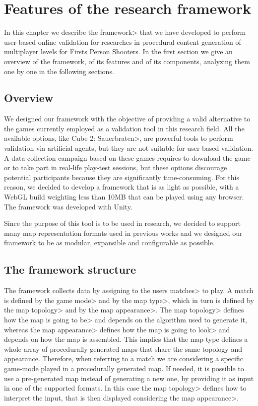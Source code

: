 \chapter{Features of the research framework}


In this chapter we describe the \<framework> that we have developed to perform user-based online validation for researches in procedural content generation of multiplayer levels for Firsts Person Shooters. In the first section we give an overview of the framework, of its features and of its components, analyzing them one by one in the following sections.


\section{Overview}

We designed our framework with the objective of providing a valid alternative to the games currently employed as a validation tool in this research field. All the available options, like \<Cube 2: Sauerbraten>, are powerful tools to perform validation via artificial agents, but they are not suitable for user-based validation. A data-collection campaign based on these games requires to download the game or to take part in real-life play-test sessions, but these options discourage potential participants because they are significantly time-consuming. For this reason, we decided to develop a framework that is as light as possible, with a WebGL build weighting less than 10MB that can be played using any browser. The framework was developed with Unity.

\par

Since the purpose of this tool is to be used in research, we decided to support many map representation formats used in previous works and we designed our framework to be as modular, expansible and configurable as possible.

\section{The framework structure}

The framework collects data by assigning to the users \<matches> to play. A match is defined by the \<game mode> and by the \<map type>, which in turn is defined by the \<map topology> and by the \<map appearance>. The \<map topology> defines how the map is going to \<be> and depends on the algorithm used to generate it, whereas the \<map appearance> defines how the map is going to \<look> and depends on how the map is assembled. This implies that the map type defines a whole array of procedurally generated maps that share the same topology and appearance. Therefore, when referring to a match we are considering a specific game-mode played in a procedurally generated map. If needed, it is possible to use a pre-generated map instead of generating a new one, by providing it as input in one of the supported formats. In this case the \<map topology> defines how to interpret the input, that is then displayed considering the \<map appearance>.

